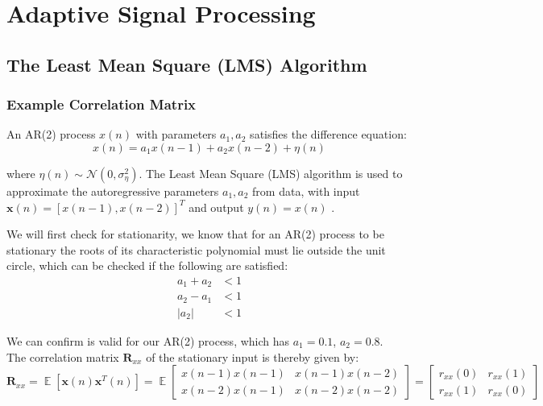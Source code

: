\documentclass[12pt]{article}
\numberwithin{equation}{section}
\DeclareMathOperator*{\E}{\mathbb{E}}
\begin{document}
\pagebreak
\section{Adaptive Signal Processing} \label{sec: 2-ASP}
	\subsection{The Least Mean Square (LMS) Algorithm} \label{sec: 2-1-LMS}
		\subsubsection{Example Correlation Matrix}
			An AR(2) process $x(n)$ with parameters $a_{1}, a_{2}$ satisfies the difference equation:
			\begin{equation}
			x(n) = a_{1} x(n - 1) + a_{2} x(n - 2) + \eta(n)
			\label{eq: 2-1a-ar_2}
			\end{equation}
			
			where $\eta(n) \sim \mathcal{N}(0, \sigma_{\eta}^{2})$. The Least Mean Square (LMS) algorithm is used to approximate the autoregressive parameters $a_{1}, a_{2}$ from data, with input $\mathbf{x}(n) = [x(n-1), x(n-2)]^{T}$ and output
			$y(n) = x(n)$ .
			
			We will first check for stationarity, we know that for an AR(2) process to be stationary the roots of its characteristic polynomial must lie outside the unit circle, which can be checked if the following are satisfied:
			\vspace*{-\baselineskip}
			\begin{align}
			a_1+a_2 & < 1 \\
			a_2-a_1 & < 1 \\
			|a_2| & < 1 
			\label{eq: 2-1a-cond:stationary}
			\end{align}
			
			We can confirm is valid for our AR(2) process, which has $a_1=0.1$, $a_2=0.8$.\\
			The correlation matrix $\mathbf{R}_{xx}$ of the stationary input is thereby given by:
			\begin{equation}
			\mathbf{R}_{xx} = \E[\mathbf{x}(n) \mathbf{x}^{T}(n)] = \E
			\begin{bmatrix}
			x(n-1) x(n-1) & x(n-1) x(n-2) \\
			x(n-2) x(n-1) & x(n-2) x(n-2)
			\end{bmatrix} =
			\begin{bmatrix}
			r_{xx}(0) & r_{xx}(1) \\
			r_{xx}(1) & r_{xx}(0)
			\end{bmatrix}
			\label{eq: 2-1a-cov_ar_2}
			\end{equation}
			
\end{document}
